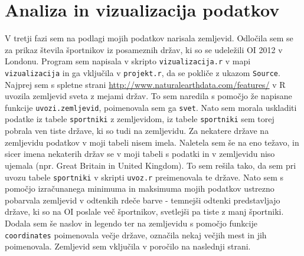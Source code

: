 \documentclass[11pt,a4paper]{article}
\begin{document}


\section{Analiza in vizualizacija podatkov}
V tretji fazi sem na podlagi mojih podatkov narisala zemljevid. Odločila sem se za prikaz števila športnikov iz posameznih držav, ki so se udeležili OI 2012 v Londonu.
\newline
Program sem napisala v skripto \verb|vizualizacija.r| v mapi \verb|vizualizacija| in ga vključila v \verb|projekt.r|, da se pokliče z ukazom \verb|Source|.
\newline
Najprej sem s spletne strani \url{http://www.naturalearthdata.com/features/} v R uvozila zemljevid sveta z mejami držav. To sem naredila s pomočjo že napisane funkcije \verb|uvozi.zemljevid|, poimenovala sem ga \verb|svet|. Nato sem morala uskladiti 
podatke iz tabele \verb|sportniki| z zemljevidom, iz tabele \verb|sportniki| sem torej pobrala ven tiste države, ki so tudi na zemljevidu. Za nekatere države na zemljevidu podatkov v moji tabeli nisem imela. Naletela sem še na eno težavo, in sicer imena nekaterih držav se v moji tabeli s podatki in v zemljevidu niso ujemala (npr. Great Britain in United Kingdom). To sem rešila tako, da sem pri uvozu tabele \verb|sportniki| v skripti \verb|uvoz.r| preimenovala te države.
\newline
Nato sem s pomočjo izračunanega minimuma in maksimuma mojih podatkov ustrezno pobarvala zemljevid v odtenkih rdeče barve - temnejši odtenki predstavljajo države, ki so na OI poslale več športnikov, svetlejši pa tiste z manj športniki.
Dodala sem še naslov in legendo ter na zemljevidu s pomočjo funkcije \verb|coordinates| poimenovala večje države, označila nekaj večjih mest in jih poimenovala.
\newline
Zemljevid sem vključila v poročilo na naslednji strani.


% 
% 
\end{document}
